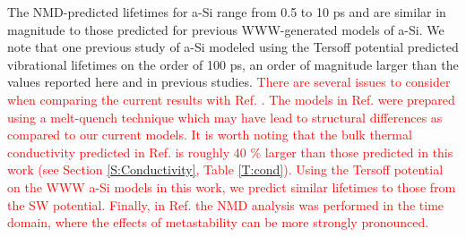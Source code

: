\documentclass[aps,prb,onecolumn,preprint,superscriptaddress,footinbib,amsmath,amssymb,floatfix]{revtex4}
\begin{document}
The NMD-predicted lifetimes for a-Si range from 0.5 to 10 ps 
and are similar in magnitude to 
those predicted for previous WWW-generated models of a-Si.
\cite{fabian_anharmonic_1996,bickham_calculation_1998,
bickham_numerical_1999,fabian_numerical_2003}  
We note that one previous study of a-Si modeled using the 
Tersoff potential predicted vibrational lifetimes on 
the order of 100 ps,\cite{he_heat_2011} an order of magnitude larger 
than the values reported here and in previous studies.
\cite{fabian_anharmonic_1996,bickham_calculation_1998,
bickham_numerical_1999,fabian_numerical_2003} 
\textcolor{red}{
There are several issues to consider when comparing the 
current results with Ref. . The models 
in Ref.  were prepared using a melt-quench 
technique which may have lead to structural differences as compared 
to our current models. It is worth 
noting that the bulk thermal conductivity predicted in Ref. 
 is roughly 40 $\%$ larger than those 
predicted in this work (see Section \ref{S:Conductivity}, 
Table \ref{T:cond}). 
Using the Tersoff 
potential on the WWW a-Si models in this work, we predict similar 
lifetimes to those from the SW potential. 
Finally, in Ref.  
the NMD analysis was performed in the time domain, where the effects of 
metastability can be more strongly pronounced. 
}
\end{document}
